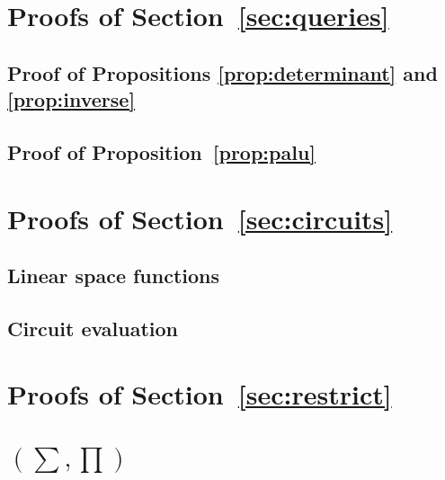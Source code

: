 
\section{Proofs of Section~\ref{sec:queries}}
\subsection{Proof of Propositions \ref{prop:determinant} and \ref{prop:inverse}}


\subsection{Proof of Proposition~\ref{prop:palu}}


\section{Proofs of Section~\ref{sec:circuits}}

\subsection{Linear space functions}


\subsection{Circuit evaluation}


\section{Proofs of Section~\ref{sec:restrict}}


\section{\lang$(\sum,\prod)$}


